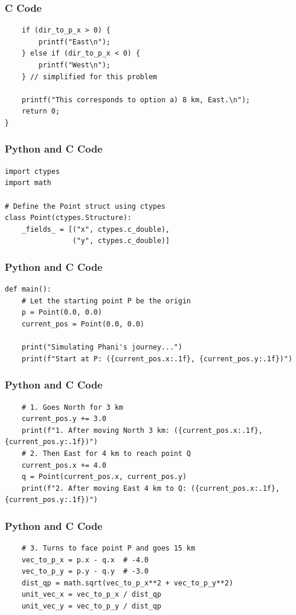 \documentclass{beamer}
\begin{document}
\begin{frame}[fragile]
\frametitle{C Code}
\begin{lstlisting}
    if (dir_to_p_x > 0) {
        printf("East\n");
    } else if (dir_to_p_x < 0) {
        printf("West\n");
    } // simplified for this problem

    printf("This corresponds to option a) 8 km, East.\n");
    return 0;
}
\end{lstlisting}
\end{frame}

\begin{frame}[fragile]
\frametitle{Python and C Code}
\begin{lstlisting}
import ctypes
import math

# Define the Point struct using ctypes
class Point(ctypes.Structure):
    _fields_ = [("x", ctypes.c_double),
                ("y", ctypes.c_double)]
\end{lstlisting}
\end{frame}

\begin{frame}[fragile]
\frametitle{Python and C Code}
\begin{lstlisting}
def main():
    # Let the starting point P be the origin
    p = Point(0.0, 0.0)
    current_pos = Point(0.0, 0.0)

    print("Simulating Phani's journey...")
    print(f"Start at P: ({current_pos.x:.1f}, {current_pos.y:.1f})")
\end{lstlisting}
\end{frame}

\begin{frame}[fragile]
\frametitle{Python and C Code}
\begin{lstlisting}
    # 1. Goes North for 3 km
    current_pos.y += 3.0
    print(f"1. After moving North 3 km: ({current_pos.x:.1f}, {current_pos.y:.1f})")
    # 2. Then East for 4 km to reach point Q
    current_pos.x += 4.0
    q = Point(current_pos.x, current_pos.y)
    print(f"2. After moving East 4 km to Q: ({current_pos.x:.1f}, {current_pos.y:.1f})")
\end{lstlisting}
\end{frame}

\begin{frame}[fragile]
\frametitle{Python and C Code}
\begin{lstlisting}
    # 3. Turns to face point P and goes 15 km
    vec_to_p_x = p.x - q.x  # -4.0
    vec_to_p_y = p.y - q.y  # -3.0
    dist_qp = math.sqrt(vec_to_p_x**2 + vec_to_p_y**2)
    unit_vec_x = vec_to_p_x / dist_qp
    unit_vec_y = vec_to_p_y / dist_qp
\end{lstlisting}
\end{frame}
\end{document}

